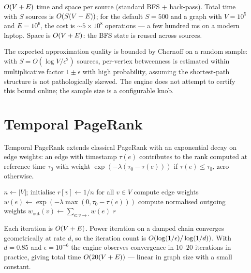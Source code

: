 \begin{complexity}
$O(V + E)$ time and space per source (standard BFS + back-pass).
Total time with $S$ sources is $O(S (V + E))$; for the default
$S = 500$ and a graph with $V = 10^5$ and $E = 10^6$, the cost is
$\sim 5 \times 10^8$ operations --- a few hundred ms on a modern
laptop. Space is $O(V + E)$: the BFS state is reused across
sources.
\end{complexity}

The expected approximation quality is bounded by Chernoff on a
random sample: with $S = O(\log V / \epsilon^2)$ sources, per-vertex
betweenness is estimated within multiplicative factor $1 \pm \epsilon$
with high probability, assuming the shortest-path structure is not
pathologically skewed. The engine does not attempt to certify this
bound online; the sample size is a configurable knob.

\section{Temporal PageRank}

Temporal PageRank extends classical PageRank with an exponential
decay on edge weights: an edge with timestamp $\tau(e)$ contributes
to the rank computed at reference time $\tau_0$ with weight
$\exp(-\lambda (\tau_0 - \tau(e)))$ if $\tau(e) \leq \tau_0$, zero
otherwise.

\begin{algorithm}
\caption{\textsc{Compute-Temporal-PageRank}}\label{alg:temporal-pr}
$n \gets |V|$; initialise $r[v] \gets 1/n$ for all $v \in V$\;
compute edge weights $w(e) \gets \exp(-\lambda \max(0, \tau_0 - \tau(e)))$\;
compute normalised outgoing weights $w_{\text{out}}(v) \gets \sum_{e: v \to \cdot} w(e)$\;
\Return $r$\;
\end{algorithm}

\begin{complexity}
Each iteration is $O(V + E)$. Power iteration on a damped chain
converges geometrically at rate $d$, so the iteration count is
$O(\log(1 / \epsilon) / \log(1/d))$. With $d = 0.85$ and
$\epsilon = 10^{-6}$ the engine observes convergence in 10--20
iterations in practice, giving total time $O(20 (V + E))$ ---
linear in graph size with a small constant.
\end{complexity}

